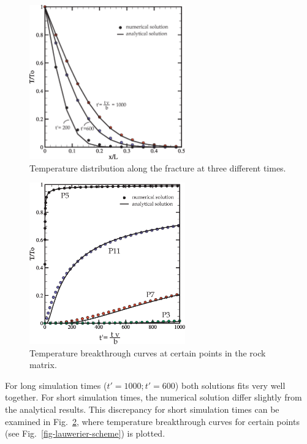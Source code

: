 \begin{figure}[!htbp]
\centering
\includegraphics[width=0.6\textwidth]{PART_II/T/lauwerier-fracture.eps}
\caption{Temperature distribution along the fracture at three different times.}
\label{fig-lauwerier-fracture}
\end{figure}

\begin{figure}[!htbp]
\centering
\includegraphics[width=0.6\textwidth]{PART_II/T/lauwerier-points.eps}
\caption{Temperature breakthrough curves at certain points in the rock matrix.}
\label{fig-lauwerier-points}
\end{figure}

For long simulation times ($t'=1000; t'=600$) both solutions fits very well together. For short simulation times, the numerical solution differ slightly from the analytical results. This discrepancy for short simulation times can be examined in Fig.~\ref{fig-lauwerier-points}, where temperature breakthrough curves for certain points (see Fig.~\ref{fig-lauwerier-scheme}) is plotted.

